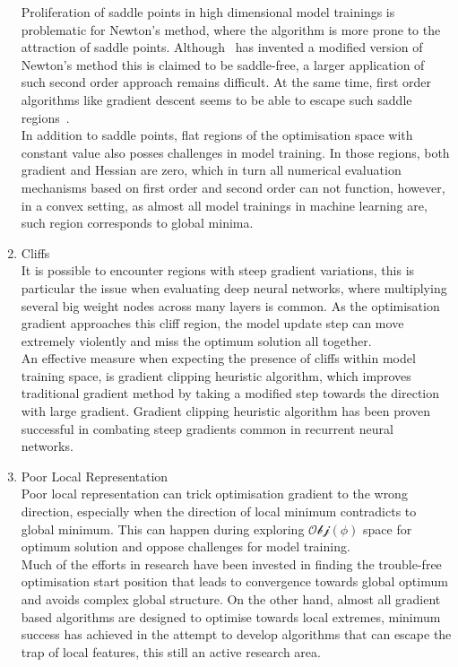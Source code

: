 \begin{enumerate}
Proliferation of saddle points in high dimensional model trainings is problematic for Newton's method, where the algorithm is more prone to the attraction of saddle points. Although~\citet{DauphinPGCGB14} has invented a modified version of Newton's method this is claimed to be saddle-free, a larger application of such second order approach remains difficult. At the same time, first order algorithms like gradient descent seems to be able to escape such saddle regions~\cite{GoodfellowV14}.\\
In addition to saddle points, flat regions of the optimisation space with constant value also posses challenges in model training. In those regions, both gradient and Hessian are zero, which in turn all numerical evaluation mechanisms based on first order and second order can not function, however, in a convex setting, as almost all model trainings in machine learning are, such region corresponds to global minima. 
    \item Cliffs \\
It is possible to encounter regions with steep gradient variations, this is particular the issue when evaluating deep neural networks, where multiplying several big weight nodes across many layers is common. As the optimisation gradient approaches this cliff region, the model update step can move extremely violently and miss the optimum solution all together. \\
An effective measure when expecting the presence of cliffs within model training space, is gradient clipping heuristic algorithm, which improves traditional gradient method by taking a modified step towards the direction with large gradient. Gradient clipping heuristic algorithm has been proven successful in combating steep gradients common in recurrent neural networks.~\cite{Pascanu2012UnderstandingTE} 
    \item Poor Local Representation \\
Poor local representation can trick optimisation gradient to the wrong direction, especially when the direction of local minimum contradicts to global minimum. This can happen during exploring $\mathcal{Obj}(\phi)$ space for optimum solution and oppose challenges for model training. \\
Much of the efforts in research have been invested in finding the trouble-free optimisation start position that leads to convergence towards global optimum and avoids complex global structure. On the other hand, almost all gradient based algorithms are designed to optimise towards local extremes, minimum success has achieved in the attempt to develop algorithms that can escape the trap of local features, this still an active research area. \\
\end{enumerate}

